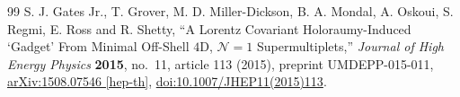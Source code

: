 \documentclass[11pt]{article}
\begin{document}
\begin{thebibliography}{99}
S. J. Gates Jr., T. Grover, M. D. Miller-Dickson, B. A. Mondal, A. Oskoui,
S. Regmi, E. Ross and R. Shetty,
``A Lorentz Covariant Holoraumy-Induced `Gadget' From Minimal Off-Shell
$4$D, $\mathcal N=1$ Supermultiplets,''
\emph{Journal of High Energy Physics} \textbf{2015}, no.~11, article 113
(2015), preprint UMDEPP-015-011,
\href{https://arxiv.org/abs/1508.07546}{arXiv:1508.07546 [hep-th]},
\href{https://doi.org/10.1007/JHEP11(2015)113}{doi:10.1007/JHEP11(2015)113}.

\end{thebibliography}
\end{document}
